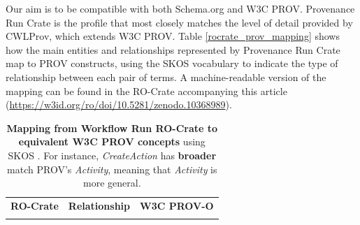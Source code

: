 \documentclass[10pt,letterpaper]{article}
\newlength\savedwidth
\newcommand\thickhline{\noalign{\global\savedwidth\arrayrulewidth\global\arrayrulewidth 2pt}%
\hline
\noalign{\global\arrayrulewidth\savedwidth}}
\begin{document}
Our aim is to be compatible with both Schema.org and W3C PROV. Provenance Run Crate is the profile that most closely matches the level of detail provided by CWLProv, which extends W3C PROV. Table \ref{rocrate_prov_mapping} shows how the main entities and relationships represented by Provenance Run Crate map to PROV constructs, using the SKOS vocabulary to indicate the type of relationship between each pair of terms. A machine-readable version of the mapping can be found in the RO-Crate accompanying this article \cite{wrroc-crate} (\url{https://w3id.org/ro/doi/10.5281/zenodo.10368989}).

\begin{table}[!ht]
  \begin{adjustwidth}{-1.5cm}{0in}
  \centering
  \caption{
  {\bf Mapping from Workflow Run RO-Crate to equivalent W3C PROV concepts} using SKOS \cite{Isaac 2009}. For instance, \emph{CreateAction} has \textbf{broader} match PROV's \emph{Activity}, meaning that \emph{Activity} is more general.}
  \begin{tabular}{p{35mm}|p{40mm}|p{40mm}}
  \hline
  {\bf RO-Crate} & \textbf{Relationship} & {\bf W3C PROV-O} \\
  \thickhline


\end{tabular}
\end{adjustwidth}
\end{table}
\end{document}
